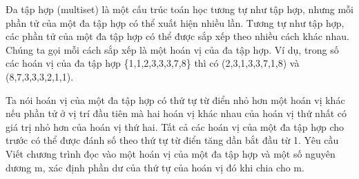 Đa tập hợp (multiset) là một cấu trúc toán học tương tự như tập hợp, nhưng mỗi phần tử của một đa tập hợp có thể xuất hiện nhiều lần. Tương tự như tập hợp, các phần tử của một đa tập hợp có thể được sắp xếp theo nhiều cách khác nhau. Chúng ta gọi mỗi cách sắp xếp là một hoán vị của đa tập hợp. Ví dụ, trong số các hoán vị của đa tập hợp \{1,1,2,3,3,3,7,8\} thì có (2,3,1,3,3,7,1,8) và (8,7,3,3,3,2,1,1).  

   Ta nói hoán vị của một đa tập hợp có thứ tự từ điển nhỏ hơn một hoán vị khác nếu phần tử ở vị trí đầu tiên mà hai hoán vị khác nhau của hoán vị thứ nhất có giá trị nhỏ hơn của hoán vị thứ hai. Tất cả các hoán vị của một đa tập hợp cho trước có thể được đánh số theo thứ tự từ điển tăng dần bắt đầu từ 1.
Yêu cầu
Viết chương trình đọc vào một hoán vị của một đa tập hợp và một số nguyên dương m, xác định phần dư của thứ tự của hoán vị đó khi chia cho m.